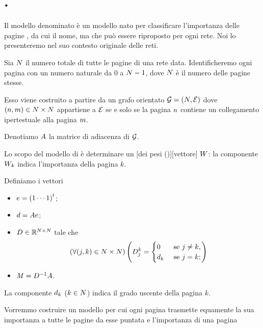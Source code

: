 \section{.}
\label{CalcoloScientifico_PageRank}
Il modello denominato
\`e un modello nato per classificare l'importanza delle pagine
, da cui il nome, ma che pu\`o essere riproposto per ogni
rete. Noi lo presenteremo nel suo contesto originale delle reti.
\par Sia $N$ il numero totale di tutte le pagine di una rete data.
Identificheremo ogni pagina con un numero naturale da $0$ a
$N - 1$, dove $N$ \`e il numero delle pagine stesse.
\par Esso viene costruito a partire da un grafo orientato
$\mathcal{G} = (N,\mathcal{E})$ dove
$(n,m) \in N \times N$ appartiene a $\mathcal{E}$
se e solo se la pagina $n$ contiene un collegamento ipertestuale
alla pagina $m$.
\par Denotiamo $A$ la matrice di adiacenza di $\mathcal{G}$.
\par Lo scopo del modello di  \`e determinare un
[dei pesi ()][vettore]
$W$: la componente $W_k$ indica l'importanza della pagina $k$.
\par Definiamo i vettori
\begin{itemize}
  \item $e = {(1 \cdots 1)}^t$;
  \item $d = A e$;
  \item $D \in \mathbb{R}^{N \times N}$
    tale che
    \[
      \left ( \forall (j,k) \in N \times N \right ) \left ( 
        D_j^k =
        \begin{cases}
          0&\text{ se } j \neq k,\\
          d_k&\text{ se } j = k;
        \end{cases} \right )
    \]
  \item $\mathit{M} = D^{-1}A$.
\end{itemize}
La componente $d_k$ ($k \in N$) indica il grado uscente
della pagina $k$.
\par Vorremmo costruire un modello per cui ogni pagina trasmette equamente
la sua importanza a tutte le pagine da esse puntata e l'importanza di una pagina
